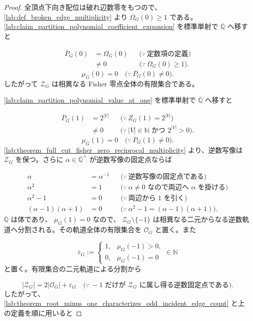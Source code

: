 \documentclass[11pt,a4paper]{article}
\theoremstyle{remark}
\begin{document}
\begin{proof}
全頂点下向き配位は破れ辺数零をもつので、
\cref{lab:def_broken_edge_multiplicity}
 より 
$\Omega_G(0)\geq1$
 である。
\cref{lab:claim_partition_polynomial_coefficient_expansion}
 を標準単射で 
$\overline{\mathbb Q}$
 へ移すと

\[\begin{aligned}
\overline P_G(0)
&=\Omega_G(0)
&&\bigl(\because\ \text{定数項の定義}\bigr)\\
&\ne0
&&\bigl(\because\ \Omega_G(0)\geq1\bigr).
\end{aligned}\]
\[\mu_G(0)=0
\quad\bigl(\because\ \overline P_G(0)\ne0\bigr).\]
したがって 
$\mathcal Z_G$
 は相異なる Fisher 零点全体の有限集合である。

\cref{lab:claim_partition_polynomial_value_at_one}
 を標準単射で 
$\overline{\mathbb Q}$
 へ移すと

\[\begin{aligned}
\overline P_G(1)
&=2^{|V|}
&&\bigl(\because\ Z_G(1)=2^{|V|}\bigr)\\
&\ne0
&&\bigl(\because\ |V|\in\mathbb N\text{ かつ }2^{|V|}>0\bigr).
\end{aligned}\]
\[\mu_G(1)=0
\quad\bigl(\because\ \overline P_G(1)\ne0\bigr).\]
\cref{lab:theorem_full_cut_fisher_zero_reciprocal_multiplicity}
 より、逆数写像は 
$\mathcal Z_G$
 を保つ。さらに 
$\alpha\in\overline{\mathbb Q}^{\times}$
 が逆数写像の固定点ならば

\[\begin{aligned}
\alpha
&=\alpha^{-1}
&&\bigl(\because\ \text{逆数写像の固定点である}\bigr)\\
\alpha^2
&=1
&&\bigl(\because\ \alpha\ne0\text{ なので両辺へ }\alpha\text{ を掛ける}\bigr)\\
\alpha^2-1
&=0
&&\bigl(\because\ \text{両辺から }1\text{ を引く}\bigr)\\
(\alpha-1)(\alpha+1)
&=0
&&\bigl(\because\ \alpha^2-1=(\alpha-1)(\alpha+1)\bigr).
\end{aligned}\]
$\overline{\mathbb Q}$
 は体であり、
$\mu_G(1)=0$
 なので、
$\mathcal Z_G\setminus\{-1\}$
 は相異なる二元からなる逆数軌道へ分割される。その軌道全体の有限集合を 
$\mathcal O_G$
 と置く。また

\[\varepsilon_G:=
\begin{cases}
1,&\mu_G(-1)>0,\\
0,&\mu_G(-1)=0
\end{cases}
\in\mathbb N\]
と置く。有限集合の二元軌道による分割から

\[|\mathcal Z_G|=2|\mathcal O_G|+\varepsilon_G
\quad\bigl(\because\ -1\text{ だけが }\mathcal Z_G\text{ に属し得る逆数固定点である}\bigr).\]
したがって、
\cref{lab:theorem_root_minus_one_characterizes_odd_incident_edge_count}
 と上の定義を順に用いると


\end{proof}
\end{document}
